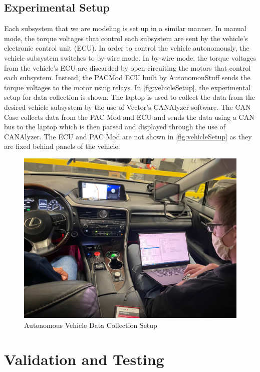 \documentclass[letterpaper,12pt]{article}   %
\begin{document}
\subsection{Experimental Setup} \label{sec:setup}
Each subsystem that we are modeling is set up in a similar manner. In manual mode, the torque voltages that control each subsystem are sent by the vehicle's electronic control unit (ECU). In order to control the vehicle autonomously, the vehicle subsystem switches to by-wire mode. In by-wire mode, the torque voltages from the vehicle's ECU are discarded by open-circuiting the motors that control each subsystem. Instead, the PACMod ECU built by AutonomouStuff sends the torque voltages to the motor using relays. In \autoref{fig:vehicleSetup}, the experimental setup for data collection is shown. The laptop is used to collect the data from the desired vehicle subsystem by the use of Vector's CANAlyzer software. The CAN Case collects data from the PAC Mod and ECU and sends the data using a CAN bus to the laptop which is then parsed and displayed through the use of CANAlyzer. The ECU and PAC Mod are not shown in \autoref{fig:vehicleSetup} as they are fixed behind panels of the vehicle. 

\begin{figure}
	\centering
    	\captionsetup{justification=centering, margin=3cm}
    	\includegraphics[width=5in]{figs/img/picturesVisitToAStuff/dataColletionSetup1-20211007}
    	\caption{Autonomous Vehicle Data Collection Setup}
    	\label{fig:vehicleSetup}
\end{figure}

\section{Validation and Testing} \label{sec:simresults}
\end{document}
